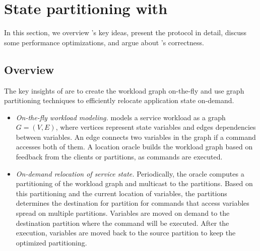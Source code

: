 \section{State partitioning with \dynastar}
\label{sec:dynastar}

In this section, we overview \dynastar's key ideas, present the protocol in detail, discuss some performance optimizations, and argue about \dynastar's correctness.

\subsection{Overview}


The key insights of \dynastar are to create the workload graph on-the-fly and use graph partitioning techniques to efficiently relocate application state on-demand.
\begin{itemize}
\item \emph{On-the-fly workload modeling.}
\dynastar models a service workload as a graph $G = (V, E)$, where vertices represent state variables and edges dependencies between variables.
An edge connects two variables in the graph if a command accesses both of them.
A location oracle builds the workload graph based on feedback from the clients or partitions, as commands are executed.
\item \emph{On-demand relocation of service state.}
Periodically, the oracle computes a partitioning of the workload graph and multicast to the partitions.
Based on this partitioning and the current location of variables, the partitions determines the destination for partition for commands that access variables spread on multiple partitions.
Variables are moved on demand to the destination partition where the command will be executed. After the execution, variables are moved back to the source partition to keep the optimized partitioning.
\end{itemize}

